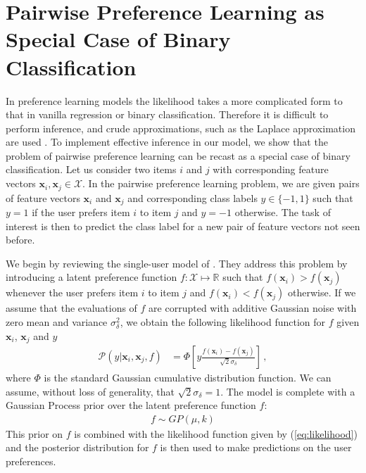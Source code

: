 \section{Pairwise Preference Learning as Special Case of Binary Classification \label{sec:prefKernel}}

In preference learning models the likelihood takes a more complicated form to that in vanilla regression or binary classification. Therefore it is difficult to perform inference, 
and crude approximations, such as the Laplace approximation are used \citep{chu2005, Bonilla2010}.
To implement effective inference in our model, we show that the problem of pairwise preference learning can be recast as a special case of binary classification. Let us consider two items $i$ and $j$ with corresponding feature vectors $\mathbf{x}_i,\mathbf{x}_j\in\mathcal{X}$.
In the pairwise preference learning problem, we are given pairs of feature vectors $\mathbf{x}_i$ and $\mathbf{x}_j$
and corresponding class labels $y\in\{-1,1\}$ such that $y=1$ if the user prefers item $i$ to item $j$
and $y=-1$ otherwise. The task of interest is then to predict the class label for a new pair of feature vectors not seen before.

We begin by reviewing the single-user model of \citep{chu2005}. They 
address this problem by introducing a latent preference function $f:\mathcal{X}\mapsto \mathbb{R}$ such that
$f(\mathbf{x}_i) > f(\mathbf{x}_j)$ whenever the user prefers item $i$ to item $j$
and $f(\mathbf{x}_i) < f(\mathbf{x}_j)$ otherwise.
If we assume that the evaluations of $f$ are corrupted with additive Gaussian
noise with zero mean and variance $\sigma_\delta^2$, we obtain the following likelihood function for $f$
given $\mathbf{x}_i$, $\mathbf{x}_j$ and $y$
\begin{align}
\mathcal{P}(y|\mathbf{x}_i,\mathbf{x}_j,f) &= \Phi\left[y\frac{f(\mathbf{x}_i) - f(\mathbf{x}_j)}{\sqrt{2}\sigma_{\delta}}\right]\,,\label{eq:likelihood}
\end{align}
where $\Phi$ is the standard Gaussian cumulative distribution function. We can assume, without loss of generality, that $\sqrt{2}\sigma_\delta=1$.
The model is complete with a Gaussian Process prior over the latent preference function $f$:
\begin{align}
	f \sim GP(\mu,k)
\end{align}
This prior on $f$ is combined with the
likelihood function given by (\ref{eq:likelihood}) and the posterior distribution for $f$ is
then used to make predictions on the user preferences. 

